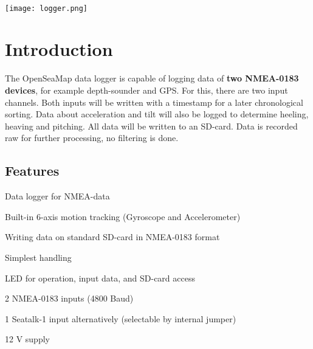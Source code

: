 \documentclass[pdftex, 8pt, paper=130mm:92mm,pagesize]{scrartcl}
\newcommand{\titel}{OpenSeaMap Data Logger}
\newcommand{\untertitel}{Instruction and installation manual}
\newcommand{\autor}{Wilfried Klaas}
\newcommand{\firma}{OpenSeaMap Projekt}
\newcommand{\documentnr}{V0.1}
\let\stdsection\section
\renewcommand\section{\newpage\stdsection}
\begin{document}

\begin{titlepage}
	\raggedleft\textbf{\color{darkblue}{\Large \titel \\ \untertitel}}\\
	\vspace{6mm}
	\color{darkblue}{\hrule height2pt}
	\vspace{2mm}
	\centerline{\texttt{[image: logger.png]}}
\end{titlepage}

\tableofcontents
\clearpage
{}



\section{Introduction}

The OpenSeaMap data logger is capable of logging data of \textbf{two NMEA-0183 devices}, for example depth-sounder and GPS. For this, there are two input channels. Both inputs will be written with a timestamp for a later chronological sorting. Data about acceleration and tilt will also be logged to determine heeling, heaving and pitching. All data will be written to an SD-card. Data is recorded raw for further processing, no filtering is done.

\subsection{Features}

\begin{compactitem}
\item Data logger for NMEA-data 
\item Built-in 6-axis motion tracking (Gyroscope and Accelerometer)
\item Writing data on standard SD-card in NMEA-0183 format
\item Simplest handling
\item LED for operation, input data, and SD-card access
\item 2 NMEA-0183 inputs (4800 Baud)
\item 1 Seatalk-1 input alternatively (selectable by internal jumper) 
\item 12 V supply
\end{compactitem}
\end{document}
